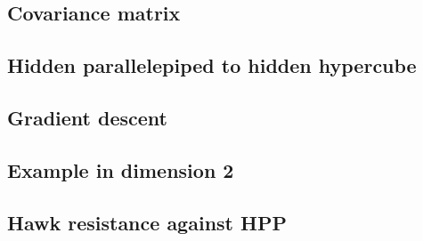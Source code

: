 \subsection{Covariance matrix}
\subsection{Hidden parallelepiped to hidden hypercube}
\subsection{Gradient descent}
\subsection{Example in dimension 2}
\subsection{Hawk resistance against HPP}

